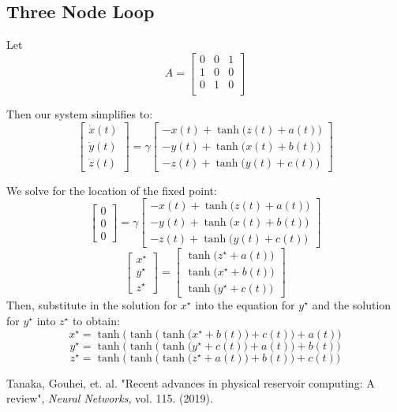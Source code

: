 \documentclass[12pt]{article}
\begin{document}
\subsection{Three Node Loop}

Let
 \[
 A = 
 \begin{bmatrix} 
 0 & 0 & 1 \\
 1 & 0 & 0 \\
 0 & 1 & 0 \\
 \end{bmatrix}
 \]
 
 Then our system simplifies to:
 \[
\begin{bmatrix} \dot{x}(t) \\ \dot{y}(t) \\ \dot{z}(t) \end{bmatrix}
=
\gamma \begin{bmatrix}
-x(t) + \tanh\Big( z(t) + a(t) \Big) \\
-y(t) + \tanh\Big( x(t) + b(t) \Big)  \\
-z(t) + \tanh\Big( y(t) + c(t) \Big)
\end{bmatrix}
\]

We solve for the location of the fixed point:
 \[
\begin{bmatrix} 0 \\ 0 \\ 0  \end{bmatrix}
=
\gamma \begin{bmatrix}
-x(t) + \tanh\Big( z(t) + a(t) \Big) \\
-y(t) + \tanh\Big( x(t) + b(t) \Big)  \\
-z(t) + \tanh\Big( y(t) + c(t) \Big)
\end{bmatrix}
\]
\[
\begin{bmatrix} x^\star \\ y^\star \\ z^\star \end{bmatrix}
=
\begin{bmatrix}
\tanh\Big( z^\star + a(t) \Big) \\
\tanh\Big( x^\star + b(t) \Big)  \\
\tanh\Big( y^\star + c(t) \Big)
\end{bmatrix}
\]
Then, substitute in the solution for $x^\star$ into the equation for $y^\star$ and the solution for $y^\star$ into $z^\star$ to obtain:
\[
x^\star = \tanh\Big( \tanh\Big( \tanh\Big( x^\star + b(t) \Big) + c(t) \Big) + a(t) \Big) 
\]
\[
y^\star = \tanh\big( \tanh\Big(\tanh\Big( y^\star + c(t) \Big) + a(t) \Big)  + b(t) \big)
\]
\[
z^\star = \tanh \big( \tanh\Big( \tanh\Big( z^\star + a(t) \Big) + b(t) \Big)  + c(t) \big)
\]


\begin{thebibliography}{9}
Tanaka, Gouhei, et. al. "Recent advances in physical reservoir computing: A review",
\textit{Neural Networks}, vol. 115. (2019).

\end{thebibliography}
\end{document}
